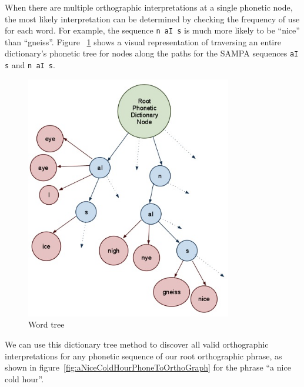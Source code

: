 When there are multiple orthographic interpretations at a single phonetic node, the most likely interpretation can be determined by checking the frequency of use for each word.  For example, the sequence \texttt{n aI s} is much more likely to be ``nice'' than ``gneiss''.  Figure ~\ref{fig:wordTree} shows a visual representation of traversing an entire dictionary's phonetic tree for nodes along the paths for the SAMPA sequences \texttt{aI s} and \texttt{n aI s}.

\begin{figure}[h]
\includegraphics[width=90mm]{wordTree.jpg}
\captionfonts
\caption[Word Tree]{Word tree}
\label{fig:wordTree}
\end{figure}

We can use this dictionary tree method to discover all valid orthographic interpretations for any phonetic sequence of our root orthographic phrase, as shown in figure~\ref{fig:aNiceColdHourPhoneToOrthoGraph} for the phrase ``a nice cold hour''.


